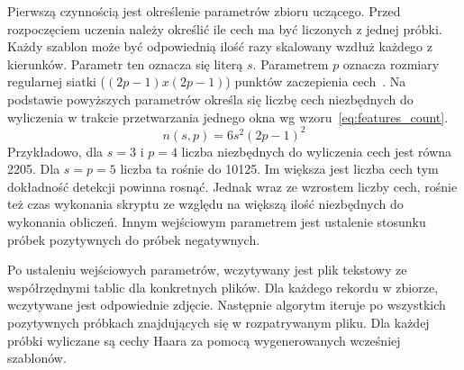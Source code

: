 \FloatBarrier
Pierwszą czynnością jest określenie parametrów zbioru uczącego.
Przed rozpoczęciem uczenia należy określić ile cech ma być liczonych z jednej próbki.
Każdy szablon może być odpowiednią ilość razy skalowany wzdłuż każdego z kierunków.
Parametr ten oznacza się literą $s$.
Parametrem $p$ oznacza rozmiary regularnej siatki ($(2p-1)x(2p-1)$) punktów zaczepienia cech~\cite{szybka_detekcja_klesk}.
Na podstawie powyższych parametrów określa się liczbę cech niezbędnych do wyliczenia w trakcie przetwarzania jednego okna wg wzoru~\eqref{eq:features_count}.
\begin{equation}
    \label{eq:features_count}
    n(s,p)=6s^2(2p-1)^2
\end{equation}
Przykładowo, dla $s=3$ i $p=4$ liczba niezbędnych do wyliczenia cech jest równa 2205.
Dla $s=p=5$ liczba ta rośnie do 10125.
Im większa jest liczba cech tym dokładność detekcji powinna rosnąć.
Jednak wraz ze wzrostem liczby cech, rośnie też czas wykonania skryptu ze względu na większą ilość niezbędnych do wykonania obliczeń.
Innym wejściowym parametrem jest ustalenie stosunku próbek pozytywnych do próbek negatywnych.

Po ustaleniu wejściowych parametrów, wczytywany jest plik tekstowy ze współrzędnymi tablic dla konkretnych plików.
Dla każdego rekordu w zbiorze, wczytywane jest odpowiednie zdjęcie.
Następnie algorytm iteruje po wszystkich pozytywnych próbkach znajdujących się w rozpatrywanym pliku.
Dla każdej próbki wyliczane są cechy Haara za pomocą wygenerowanych wcześniej szablonów.

